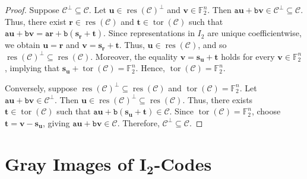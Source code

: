 \documentclass[12pt]{article}
\theoremstyle{definition}
\theoremstyle{plain}
\begin{document}
\begin{proof}
Suppose $\mathcal{C}^\perp \subseteq \mathcal{C}$. Let $\mathbf{u} \in \operatorname{res}(\mathcal{C})^\perp$ and $\mathbf{v} \in \mathbb{F}_2^n$. Then $\mathtt{a}\mathbf{u} + \mathtt{b}\mathbf{v} \in \mathcal{C}^\perp \subseteq \mathcal{C}$. Thus, there exist $\mathbf{r} \in \operatorname{res}(\mathcal{C})$ and $\mathbf{t} \in \operatorname{tor} (\mathcal{C})$ such that $\mathtt{a}\mathbf{u} + \mathtt{b}\mathbf{v}
= \mathtt{a}\mathbf{r} + \mathtt{b}(\mathbf{s}_{\mathbf{r}} + \mathbf{t})$. Since representations in $I_2$ are unique coefficientwise, we obtain $\mathbf{u} = \mathbf{r}$ and $\mathbf{v} = \mathbf{s}_{\mathbf{r}} + \mathbf{t}$. Thus, $\mathbf{u} \in \operatorname{res}(\mathcal{C})$, and so $\operatorname{res}(\mathcal{C})^\perp \subseteq \operatorname{res}(\mathcal{C})$. Moreover, the equality $\mathbf{v} = \mathbf{s}_{\mathbf{u}} + \mathbf{t}$ holds for every $\mathbf{v} \in \mathbb{F}_2^n$, implying that $\mathbf{s}_{\mathbf{u}} + \operatorname{tor}(\mathcal{C}) = \mathbb{F}_2^n$. Hence, $\operatorname{tor}(\mathcal{C}) = \mathbb{F}_2^n$.

Conversely, suppose $\operatorname{res}(\mathcal{C})^\perp \subseteq \operatorname{res}(\mathcal{C})$ and $\operatorname{tor}(\mathcal{C}) = \mathbb{F}_2^n$. Let $\mathtt{a}\mathbf{u} + \mathtt{b}\mathbf{v} \in \mathcal{C}^\perp$. Then $\mathbf{u} \in \operatorname{res}(\mathcal{C})^\perp \subseteq \operatorname{res}(\mathcal{C})$. Thus, there exists $\mathbf{t} \in \operatorname{tor}(\mathcal{C})$ such that $\mathtt{a}\mathbf{u} + \mathtt{b}(\mathbf{s}_{\mathbf{u}} + \mathbf{t}) \in \mathcal{C}$. Since $\operatorname{tor}(\mathcal{C}) = \mathbb{F}_2^n$, choose $\mathbf{t} = \mathbf{v}-\mathbf{s}_{\mathbf{u}}$, giving $\mathtt{a}\mathbf{u} + \mathtt{b}\mathbf{v} \in \mathcal{C}$. Therefore, $\mathcal{C}^\perp \subseteq \mathcal{C}$.
\end{proof}




\section{Gray Images  of $\boldsymbol{I_2}$-Codes}
\label{sec: Gray images of I2-codes}
\end{document}

